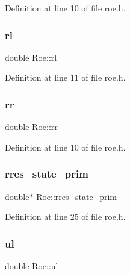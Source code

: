 Definition at line 10 of file roe.\+h.

\mbox{\label{classRoe_a5b749a16ae02029d4f9566251c7e6062}} 
\subsubsection{\texorpdfstring{rl}{rl}}
{\footnotesize\ttfamily double Roe\+::rl\hspace{0.3cm}{\ttfamily [private]}}



Definition at line 11 of file roe.\+h.

\mbox{\label{classRoe_a4c6b1752f3de01ed67d4bcb128bc9582}} 
\subsubsection{\texorpdfstring{rr}{rr}}
{\footnotesize\ttfamily double Roe\+::rr\hspace{0.3cm}{\ttfamily [private]}}



Definition at line 10 of file roe.\+h.

\mbox{\label{classRoe_a5337654ff25037aecb28c9607f8f655c}} 
\subsubsection{\texorpdfstring{rres\+\_\+state\+\_\+prim}{rres\_state\_prim}}
{\footnotesize\ttfamily double$\ast$ Roe\+::rres\+\_\+state\+\_\+prim\hspace{0.3cm}{\ttfamily [private]}}



Definition at line 25 of file roe.\+h.

\mbox{\label{classRoe_a296c4c3e1342d0f7a3b74db532d25da4}} 
\subsubsection{\texorpdfstring{ul}{ul}}
{\footnotesize\ttfamily double Roe\+::ul\hspace{0.3cm}{\ttfamily [private]}}



